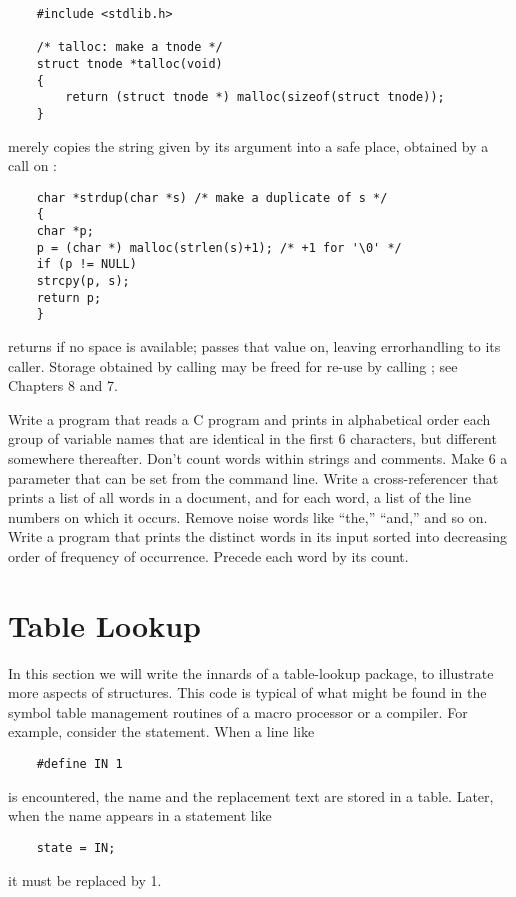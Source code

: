 \begin{lstlisting}
	#include <stdlib.h>

	/* talloc: make a tnode */
	struct tnode *talloc(void)
	{
		return (struct tnode *) malloc(sizeof(struct tnode));
	}
\end{lstlisting}
 merely copies the string given by its argument into a safe place, obtained by a call on :
\begin{lstlisting}
	char *strdup(char *s) /* make a duplicate of s */
	{
	char *p;
	p = (char *) malloc(strlen(s)+1); /* +1 for '\0' */
	if (p != NULL)
	strcpy(p, s);
	return p;
	}
\end{lstlisting}
 returns  if no space is available;  passes that value on, leaving errorhandling to its caller.
Storage obtained by calling  may be freed for re-use by calling ; see Chapters 8 and 7.
\newline

\begin{ExerciseList}
\Exercise Write a program that reads a C program and prints in alphabetical order each group of variable names that are identical in the first 6 characters, but different somewhere thereafter. Don't count words within strings and comments. Make 6 a parameter that can be set from the command line.
\Exercise Write a cross-referencer that prints a list of all words in a document, and for each word, a list of the line numbers on which it occurs. Remove noise words like ``the,'' ``and,'' and so on.
\Exercise Write a program that prints the distinct words in its input sorted into decreasing order of frequency of occurrence. Precede each word by its count.
\end{ExerciseList}



\section{Table Lookup}


In this section we will write the innards of a table-lookup package, to illustrate more aspects of structures.
This code is typical of what might be found in the symbol table management routines of a macro processor or a compiler.
For example, consider the  statement. When a line like
\begin{lstlisting}
	#define IN 1
\end{lstlisting}
is encountered, the name  and the replacement text  are stored in a table. Later, when the name  appears in a statement like
\begin{lstlisting}
	state = IN;
\end{lstlisting}
it must be replaced by 1.

